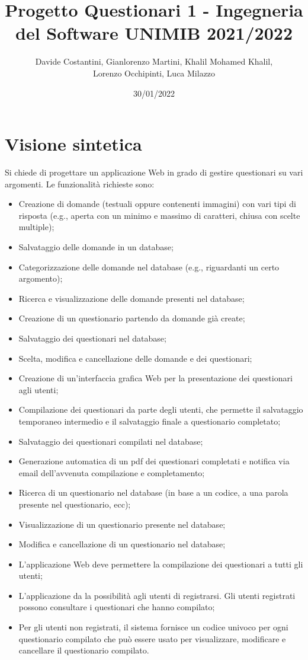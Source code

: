 \documentclass[12pt]{article}
\title{ Progetto Questionari 1 - Ingegneria del Software  UNIMIB 2021/2022} %
\author{Davide Costantini, Gianlorenzo Martini, Khalil Mohamed Khalil, \\ Lorenzo Occhipinti, Luca Milazzo} %
\date{30/01/2022} %
\begin{document}
\maketitle %

\newpage
\tableofcontents \newpage
\section{Visione sintetica}

Si chiede di progettare un applicazione Web in grado di gestire questionari su vari argomenti.
Le funzionalit\`{a} richieste sono:
\begin{itemize}
\item Creazione di domande (testuali oppure contenenti immagini) con vari tipi di risposta (e.g., aperta con un minimo e massimo di caratteri, chiusa con scelte multiple);
\item Salvataggio delle domande in un database;
\item Categorizzazione delle domande nel database (e.g., riguardanti un certo argomento);
\item Ricerca e visualizzazione delle domande presenti nel database;
\item Creazione di un questionario partendo da domande gi\`{a} create;
\item Salvataggio dei questionari nel database;
\item Scelta, modifica e cancellazione delle domande e dei questionari;
\item Creazione di un'interfaccia grafica Web per la presentazione dei questionari agli utenti;
\item Compilazione dei questionari da parte degli utenti, che permette il salvataggio temporaneo intermedio e il salvataggio finale a questionario completato;
\item Salvataggio dei questionari compilati nel database;
\item Generazione automatica di un pdf dei questionari completati e notifica via email dell'avvenuta
compilazione e completamento;
\item Ricerca di un questionario nel database (in base a un codice, a una parola presente nel questionario, ecc);
\item Visualizzazione di un questionario presente nel database;
\item Modifica e cancellazione di un questionario nel database;
\item L'applicazione Web deve permettere la compilazione dei questionari a tutti gli utenti;
\item L'applicazione da la possibilit\`{a} agli utenti di registrarsi. Gli utenti registrati possono consultare i questionari che hanno compilato;
\item Per gli utenti non registrati, il sistema fornisce un codice univoco per ogni questionario compilato che pu\`{o} essere usato per visualizzare, modificare e cancellare il questionario compilato.
\end{itemize}
\end{document}

